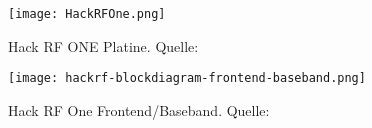 \begin{figure}[H]
	\centering
	\texttt{[image: HackRFOne.png]}
	\caption[Hack RF ONE Platine]{Hack RF ONE Platine. Quelle: \cite{HackRFOne:2018}} 
	\label{HackRFOne}
\end{figure}

\begin{figure}[ht]
	\centering
	\texttt{[image: hackrf-blockdiagram-frontend-baseband.png]}
	\caption[Hack RF One Frontend/Baseband]{Hack RF One Frontend/Baseband. Quelle: \cite{hackrf-wiki:2016}} 
	\label{HackRFOne-Blockschaltbild}
\end{figure}
